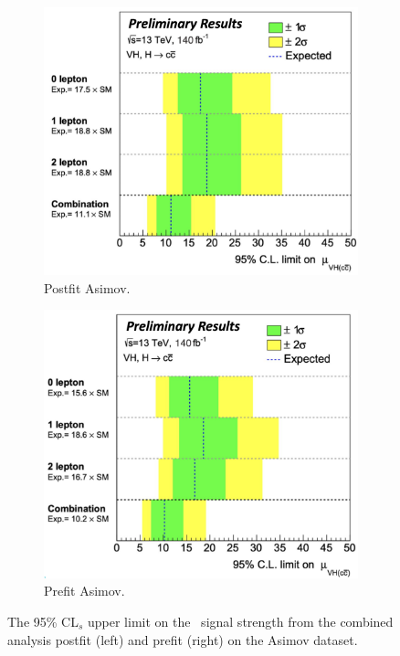 \begin{figure}[h!]
    \centering
    \begin{subfigure}[b]{0.48\textwidth}
        \centering
        \includegraphics[width=\textwidth]{Images/VH/Fit/fromSlides/postfitVHcc.png}
        \caption{Postfit Asimov.}
        \label{fig:fit_new_vhcclimitPostfit}
    \end{subfigure}
    \begin{subfigure}[b]{0.48\textwidth}
      \centering
      \includegraphics[width=\textwidth]{Images/VH/Fit/fromSlides/prefitVHcc.png}
      \caption{Prefit Asimov.}
      \label{fig:fit_new_vhcclimitPrefit}
  \end{subfigure}
    \caption{The 95\% CL$_s$ upper limit on the \vhc\ signal strength from the combined analysis postfit (left) and prefit (right) on the Asimov dataset.}
    \label{fig:fit_vhcc_limits}
\end{figure} 
